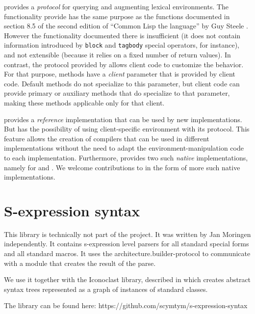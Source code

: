 \trucler{} provides a \clos{} \emph{protocol} for querying and
augmenting lexical environments.  The functionality provide has the
same purpose as the functions documented in section 8.5 of the second
edition of ``Common Lisp the language'' by Guy Steele
\cite{Steele:1990:CLL:95411}.  However the functionality documented
there is insufficient (it does not contain information introduced by
\texttt{block} and \texttt{tagbody} special operators, for instance),
and not extensible (because it relies on a fixed number of return
values).  In contrast, the protocol provided by \trucler{} allows
client code to customize the behavior.  For that purpose, \trucler{}
methods have a \emph{client} parameter that is provided by client
code.  Default \trucler{} methods do not specialize to this parameter,
but client code can provide primary or auxiliary methods that do
specialize to that parameter, making these methods applicable only for
that client.

\trucler{} provides a \emph{reference} implementation that can be used
by new \commonlisp{} implementations.  But \trucler{} has the
possibility of using client-specific environment with its protocol.
This feature allows the creation of compilers that can be used in
different \commonlisp{} implementations without the need to adapt the
environment-manipulation code to each implementation.  Furthermore,
\trucler{} provides two such \emph{native} implementations, namely for
\sbcl{} and \ccl{}.  We welcome contributions to \trucler{} in the
form of more such native implementations.

\section{S-expression syntax}
\label{sec-s-expression-syntax}

This library is technically not part of the \sysname{} project.  It
was written by Jan Moringen independently.  It contains s-expression
level parsers for all standard special forms and all standard macros.
It uses the architecture.builder-protocol to communicate with a module
that creates the result of the parse.

We use it together with the Iconoclast library, described in
 which creates abstract syntax trees represented as
a graph of instances of standard classes.

The library can be found here:
https://github.com/scymtym/s-expression-syntax 
